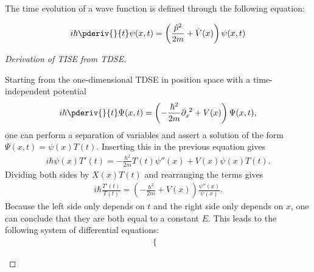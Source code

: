     The time evolution of a wave function is defined through the following equation:
    \begin{example}
        \begin{gather}
            \label{wavematrix:TDSE_position}
            i\hbar\pderiv{}{t}\psi(x,t) = \left(\frac{\hat{p}^2}{2m} + \hat{V}(x)\right)\psi(x,t)
        \end{gather}
        \begin{proof}[Derivation of TISE from TDSE]
            \begin{mdframed}[roundcorner=10pt, linecolor=blue, linewidth=1pt]
                Starting from the one-dimensional TDSE in position space with a time-independent potential
                \begin{gather}
               		i\hbar\pderiv{}{t}\Psi(x,t) = \left(-\frac{\hbar^2}{2m}\partial_x^{\ 2} + V(x)\right)\Psi(x,t),
               	\end{gather}
                one can perform a separation of variables and assert a solution of the form $\Psi(x,t) = \psi(x)T(t)$. Inserting this in the previous equation gives
                \begin{gather}
               		i\hbar\psi(x)T'(t) = -\frac{\hbar^2}{2m}T(t)\psi''(x) + V(x)\psi(x)T(t).
               	\end{gather}
                Dividing both sides by $X(x)T(t)$ and rearranging the terms gives
                \begin{gather}
               		i\hbar\frac{T'(t)}{T(t)} = \left(-\frac{\hbar^2}{2m} + V(x)\right)\frac{\psi''(x)}{\psi(x)}.
               	\end{gather}
                Because the left side only depends on $t$ and the right side only depends on $x$, one can conclude that they are both equal to a constant $E$. This leads to the following system of differential equations:
                \begin{gather}
                    \begin{cases}

\end{cases}
\end{gather}
\end{mdframed}
\end{proof}
\end{example}
